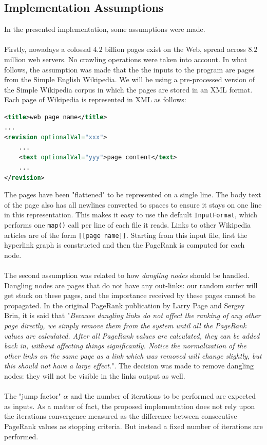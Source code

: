 \documentclass[11pt,a4paper]{article}
\begin{document}
\subsection{Implementation Assumptions}
In the presented implementation, some assumptions were made.\\
\\
Firstly, 
nowadays a colossal $4.2$ billion pages exist on the Web, spread across $8.2$ million web servers. No crawling operations were taken into account. In what follows, the assumption was made that the the inputs to the program are pages from the Simple English Wikipedia. We will be using a pre-processed version of the Simple Wikipedia corpus in which the pages are stored in an XML format. Each page of Wikipedia is represented in XML as follows:
\begin{lstlisting}[language=xml]
<title>web page name</title>
...
<revision optionalVal="xxx">
    ...
    <text optionalVal="yyy">page content</text>
    ...
</revision>
\end{lstlisting}
The pages have been "flattened" to be represented on a single line. The body text of the page also has all newlines converted to spaces to ensure it stays on one line in this representation. This makes it easy to use the default \texttt{InputFormat}, which performs one \texttt{map()} call per line of each file it reads. Links to other Wikipedia articles are of the form \texttt{[[page name]]}. Starting from this input file, first the hyperlink graph is constructed and then the PageRank is computed for each node.\\
\\
The second assumption was related to how \textit{dangling nodes} should be handled. Dangling nodes are pages that do not have any out-links: our random surfer will get stuck on these pages, and  the importance received by these pages cannot be propagated. In the original PageRank publication by Larry Page and Sergey Brin, it is said that "\textit{Because dangling links do not affect the ranking of any other page directly, we simply remove them from the system until all the PageRank values are calculated. After all PageRank values are calculated, they can be added back in, without affecting things significantly. Notice the normalization of the other links on the same page as a link which was removed will change slightly, but this should not have a large effect.}". The decision was made to remove dangling nodes: they will not be visible in the links output as well.\\
\\
The "jump factor" $\alpha$ and the number of iterations to be performed are expected as inputs. As a matter of fact, the proposed implementation does not rely upon the iterations convergence measured as the difference between consecutive PageRank values as stopping criteria. But instead a fixed number of iterations are performed.
\end{document}
